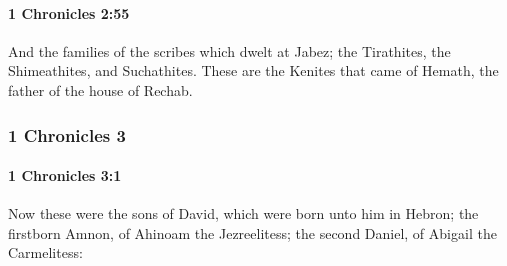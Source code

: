 		\paragraph{1 Chronicles 2:55} %
			\label{1CHRONICLES-2-55}

			And the families of the scribes which dwelt at Jabez; the Tirathites, the Shimeathites, and Suchathites. These are the Kenites that came of Hemath, the father of the house of Rechab.

	\subsubsection{1 Chronicles 3} %
		\label{1CHRONICLES-3}

		\paragraph{1 Chronicles 3:1} %
			\label{1CHRONICLES-3-1}

			Now these were the sons of David, which were born unto him in Hebron; the firstborn Amnon, of Ahinoam the Jezreelitess; the second Daniel, of Abigail the Carmelitess:


